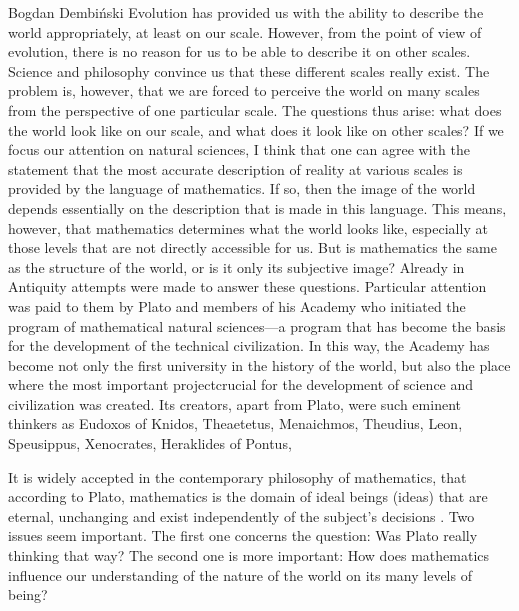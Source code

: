 \begin{artengenv}{Bogdan Dembiński}
\lettrine[loversize=0.13,lines=2,lraise=-0.05,nindent=0em,findent=0.2pt]%
{E}{}volution has provided us with the ability to describe the world appropriately, at least on%
 our scale. However, from the point of view of evolution, there is no reason for us to be able to describe it on other
scales. Science and philosophy convince us that these different scales really exist. The problem is, however, that we
are forced to perceive the world on many scales from the perspective of one particular scale. The questions thus arise:
what does the world look like  on our scale, and what does it look like on other scales? If we focus our attention on
natural sciences, I think that one can agree with the statement that the most accurate description of reality at
various scales is provided by the language of mathematics. If so, then the image of the world depends essentially on
the description that is made in this language. This means, however, that mathematics determines what the world looks
like, especially at those levels that are not directly accessible for us. But is mathematics the same as the structure
of the world, or is it only its subjective image? Already in Antiquity attempts were made to answer
these questions. Particular attention was paid to them by Plato and members of his Academy who initiated the program of
mathematical natural sciences---a program that has become the basis for the development of the technical civilization.
In this way, the Academy has become not only the first university in the history of the world, but also the place where
the most important projectcrucial for the development of science and civilization was created. Its creators, apart from
Plato, were such eminent thinkers as Eudoxos of Knidos, Theaetetus, Menaichmos, Theudius,%
Leon, Speusippus, Xenocrates, Heraklides of Pontus, 

It is widely accepted in the contemporary philosophy of mathematics, that according to Plato, mathematics is the domain
of ideal beings (ideas) that are eternal, unchanging and exist independently of the subject's decisions
\parencite[pp.12–16]{brown_philosophy_2008}.
Two issues seem important. The first
one concerns the question: Was Plato really thinking that way? The second one is more important: How does mathematics
influence our understanding of the nature of the world on its many levels of being?


\end{artengenv}
